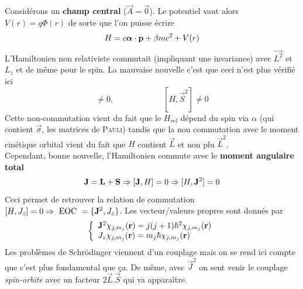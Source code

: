 Considérons un \textbf{champ central} ($\vec{A}=\vec0$). Le potentiel vaut alors $V(r)=q\Phi(r)$ de
sorte que l'on puisse écrire
\begin{equation}
H = 
c  \mbox{\boldmath $ \alpha $} \cdot  {\bf p}
 + \beta m c^2 + V(r)
\end{equation}
L'Hamiltonien non relativiste commutait (impliquant une invariance) avec $\vec{L^2}$ et $L_z$ et de
même pour le spin. La mauvaise nouvelle c'est que ceci n'est plus vérifié ici
\begin{equation}
[H,\vec{L}^2] \neq 0,\qquad\qquad\qquad [H,\vec{S}^2] \neq 0
\end{equation}
Cette non-commutation vient du fait que le $H_{rel}$ dépend du spin via $\alpha$ (qui contient 
$\vec \sigma$, les matrices de \textsc{Pauli}) tandis que la non commutation avec le moment cinétique
orbital vient du fait que $H$ contient $\vec{L}$ et non plu $\vec{L}^2$.\\

Cependant, bonne nouvelle, l'Hamiltonien commute avec le \textbf{moment angulaire total}
\begin{equation}
{\bf J} = {\bf L} + {\bf S} \Rightarrow [ {\bf J}, H ] = 0
\Rightarrow [H, {\bf J}^2] = 0
\end{equation}
Ceci permet de retrouver la relation de commutation $[ H , J_z ] = 0 \Rightarrow ~\mbox{EOC}~ = \{
{\bf J}^2, J_z \}$. Les vecteur/valeurs propres sont donnés par 
\begin{equation}
 \left\{ \begin{array}{l}
{\bf J}^2 \chi_{j,m_j} ({\bf r}) = j(j+1) \hbar^2 \chi_{j,m_j} ({\bf r}) \\
J_z \chi_{j,m_j} ({\bf r}) = m_j \hbar \chi_{j,m_j} ({\bf r}) 
\end{array} \right.
\end{equation}
Les problèmes de Schrödinger viennent d'un couplage mais on se rend ici compte que c'est plus 
fondamental que ça. De même, avec $\vec{J}^2$ on sent venir le couplage \textit{spin-orbite} avec
un facteur $2\vec{L}.\vec{S}$ qui va apparaître.\\

